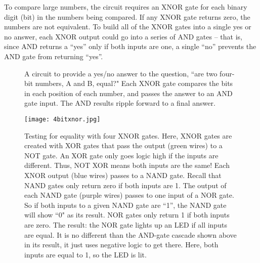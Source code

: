 To compare large numbers, the circuit requires an XNOR gate for each binary digit (bit) in the numbers being compared. If any XNOR gate returns zero, the numbers are not equivalent. To build all of the XNOR gates into a single yes or no answer, each XNOR output could go into a series of AND gates -- that is, since AND returns a ``yes'' only if both inputs are one, a single ``no'' prevents the AND gate from returning ``yes''. 


\begin{figure}[h!]
\begin{center}

\caption{A circuit to provide a yes/no answer to the question, ``are  two four-bit numbers, A and B, equal?" Each XNOR gate compares the bits in each position of each number, and passes the answer to an AND gate input. The AND results ripple forward to a final answer.}
\end{center}
\end{figure}


\begin{figure}[h!]
\begin{center}
\texttt{[image: 4bitxnor.jpg]}
\caption{Testing for equality with four XNOR gates. Here, XNOR gates are created with XOR gates that pass the output (green wires) to a NOT gate. An XOR gate only goes logic high if the inputs are different. Thus, NOT XOR means both inputs are the same! Each XNOR output (blue wires) passes to a NAND gate. Recall that NAND gates only return zero if both inputs are 1. The output of each NAND gate (purple wires) passes to one input of a NOR gate. So if both inputs to a given NAND gate are ``1'', the NAND gate will show ``0" as its result. NOR gates only return 1 if both inputs are zero. The result: the NOR gate lights up an LED if all inputs are equal. It is no different than the AND-gate cascade shown above in its result, it just uses negative logic to get there. Here, both inputs are equal to 1, so the LED is lit.}
\end{center}
\end{figure}







\clearpage


